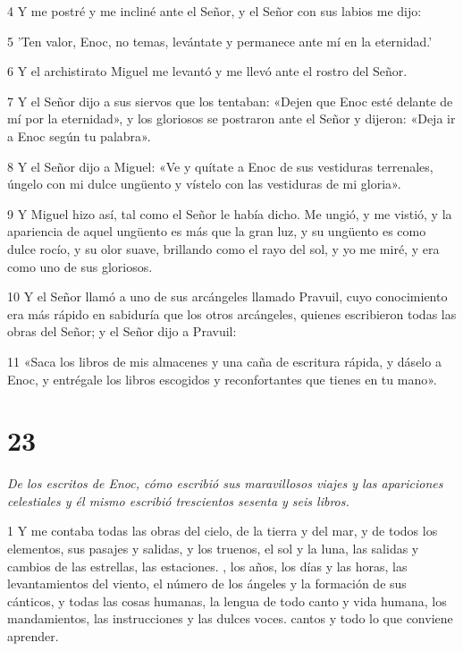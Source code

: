 \par 4 Y me postré y me incliné ante el Señor, y el Señor con sus labios me dijo:

\par 5 'Ten valor, Enoc, no temas, levántate y permanece ante mí en la eternidad.'

\par 6 Y el archistirato Miguel me levantó y me llevó ante el rostro del Señor.

\par 7 Y el Señor dijo a sus siervos que los tentaban: «Dejen que Enoc esté delante de mí por la eternidad», y los gloriosos se postraron ante el Señor y dijeron: «Deja ir a Enoc según tu palabra».

\par 8 Y el Señor dijo a Miguel: «Ve y quítate a Enoc de sus vestiduras terrenales, úngelo con mi dulce ungüento y vístelo con las vestiduras de mi gloria».

\par 9 Y Miguel hizo así, tal como el Señor le había dicho. Me ungió, y me vistió, y la apariencia de aquel ungüento es más que la gran luz, y su ungüento es como dulce rocío, y su olor suave, brillando como el rayo del sol, y yo me miré, y era como uno de sus gloriosos.

\par 10 Y el Señor llamó a uno de sus arcángeles llamado Pravuil, cuyo conocimiento era más rápido en sabiduría que los otros arcángeles, quienes escribieron todas las obras del Señor; y el Señor dijo a Pravuil:

\par 11 «Saca los libros de mis almacenes y una caña de escritura rápida, y dáselo a Enoc, y entrégale los libros escogidos y reconfortantes que tienes en tu mano».



\chapter{23}

\par \textit{De los escritos de Enoc, cómo escribió sus maravillosos viajes y las apariciones celestiales y él mismo escribió trescientos sesenta y seis libros.}

\par 1 Y me contaba todas las obras del cielo, de la tierra y del mar, y de todos los elementos, sus pasajes y salidas, y los truenos, el sol y la luna, las salidas y cambios de las estrellas, las estaciones. , los años, los días y las horas, las levantamientos del viento, el número de los ángeles y la formación de sus cánticos, y todas las cosas humanas, la lengua de todo canto y vida humana, los mandamientos, las instrucciones y las dulces voces. cantos y todo lo que conviene aprender.

